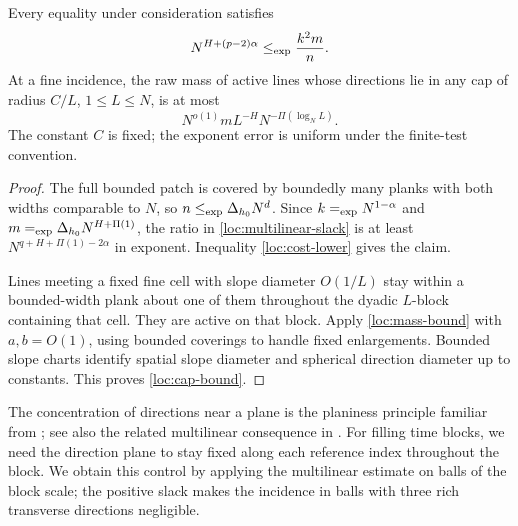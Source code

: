 \begin{lemma}
\label{loc:slack-caps}
Every equality under consideration satisfies
\begin{equation}
 N^{H+(p-2)\alpha}\mathrel{\leq_{\mathrm{exp}}}\frac{k^2m}{n}.
 \label{loc:multilinear-slack}
\end{equation}
At a fine incidence, the raw mass of active lines whose directions
lie in any cap of radius $C/L$, $1\leq L\leq N$, is at most
\begin{equation}
 N^{o(1)}mL^{-H}N^{-\Pi(\log_N L)}.
 \label{loc:cap-bound}
\end{equation}
The constant $C$ is fixed; the exponent error is uniform under the
finite-test convention.
\end{lemma}

\begin{proof}
The full bounded patch is covered by boundedly many planks with both
widths comparable to $N$, so $n\mathrel{\leq_{\mathrm{exp}}}\Delta_{h_0}N^d$.  Since
$k\mathrel{=_{\mathrm{exp}}} N^{1-\alpha}$ and
$m\mathrel{=_{\mathrm{exp}}}\Delta_{h_0}N^{H+\Pi(1)}$, the ratio in
\eqref{loc:multilinear-slack} is at least
$N^{q+H+\Pi(1)-2\alpha}$ in exponent.  Inequality
\eqref{loc:cost-lower} gives the claim.

Lines meeting a fixed fine cell with slope diameter $O(1/L)$ stay
within a bounded-width plank about one of them throughout the
dyadic $L$-block containing that cell.  They are active on that block.
Apply \eqref{loc:mass-bound} with $a,b=O(1)$, using bounded coverings
to handle fixed enlargements.  Bounded slope charts identify spatial
slope diameter and spherical direction diameter up to constants.
This proves \eqref{loc:cap-bound}.
\end{proof}

The concentration of directions near a plane is the planiness
principle familiar from \citet{KLT2000}; see also the related
multilinear consequence in \citet[Corollary~1.4]{Guth2010}.
For filling time blocks, we need the direction plane to stay fixed
along each reference index throughout the block.  We obtain this control
by applying the multilinear estimate on balls of the block scale;
the positive slack makes the incidence in balls with three rich
transverse directions negligible.

